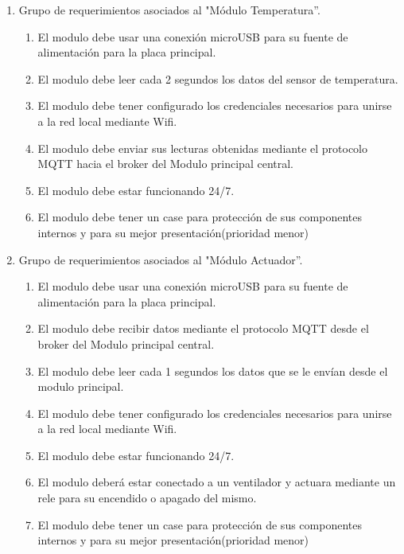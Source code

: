 \documentclass[11pt]{charter}
\begin{document}
\begin{enumerate}
\begin{enumerate}
	\end{enumerate}	
\item Grupo de requerimientos asociados al "Módulo Temperatura''.
	\begin{enumerate}
	\item El modulo debe usar una conexión microUSB para su fuente de alimentación para la placa principal.
	\item El modulo debe leer cada 2 segundos los datos del sensor de temperatura.
	\item El modulo debe tener configurado los credenciales necesarios para unirse a la red local mediante Wifi.
	\item El modulo debe enviar sus lecturas obtenidas mediante el protocolo MQTT hacia el broker del Modulo principal central.
	\item El modulo debe estar funcionando 24/7.
	\item El modulo debe tener un case para protección de sus componentes internos y para su mejor presentación(prioridad menor)
	\end{enumerate}	
\item Grupo de requerimientos asociados al "Módulo Actuador''.
	\begin{enumerate}
	\item El modulo debe usar una conexión microUSB para su fuente de alimentación para la placa principal.
		\item El modulo debe recibir datos mediante el protocolo MQTT desde el broker del Modulo principal central.
	\item El modulo debe leer cada 1 segundos los datos que se le envían desde el modulo principal.
	\item El modulo debe tener configurado los credenciales necesarios para unirse a la red local mediante Wifi.
	\item El modulo debe estar funcionando 24/7.
	\item El modulo deberá estar conectado a un ventilador y actuara mediante un rele para su encendido o apagado del mismo.
	\item El modulo debe tener un case para protección de sus componentes internos y para su mejor presentación(prioridad menor)
	\end{enumerate}


\end{enumerate}
\end{document}
